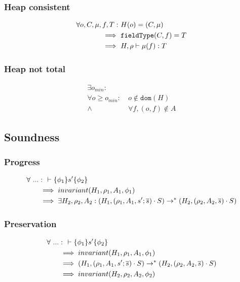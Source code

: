 \documentclass[11pt,a4paper]{article}
\begin{document}
\subsubsection{Heap consistent}
\begin{align*}
\forall o, C, \mu, f, T :&~ 
H(o) = (C, \mu) \\
\implies&~ 
\texttt{fieldType}(C,f) = T \\
\implies&~
H, \rho \vdash \mu(f) : T
\end{align*}

\subsubsection{Heap not total}
\begin{align*}
\exists o_{min} :&\\
\forall o \ge o_{min} :&~ o \not \in \texttt{dom}(H) \\
\wedge&~ \forall f, (o, f) \not \in A
\end{align*}

\subsection{Soundness}
\subsubsection{Progress}
\begin{align*}
\forall~ ... &:~~ \vdash\{\phi_1\}s'\{\phi_2\} 
\\ &\implies invariant(H_1, \rho_1, A_1, \phi_1)
\\ &\implies \exists H_2, \rho_2, A_2 : (H_1, (\rho_1, A_1, s' ; \overline{s}) \cdot S)
							\rightarrow^* (H_2, (\rho_2, A_2, \overline{s}) \cdot S)
\end{align*}

\subsubsection{Preservation}
\begin{align*}
\forall~ ... &:~~ \vdash\{\phi_1\}s'\{\phi_2\} 
\\ &\implies invariant(H_1, \rho_1, A_1, \phi_1)
\\ &\implies (H_1, (\rho_1, A_1, s' ; \overline{s}) \cdot S)
  \rightarrow^* (H_2, (\rho_2, A_2, \overline{s}) \cdot S)
\\ &\implies invariant(H_2, \rho_2, A_2, \phi_2)
\end{align*}
\end{document}
